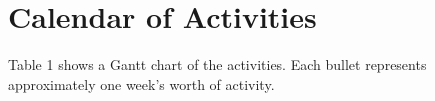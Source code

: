 


\section{Calendar of Activities}
Table 1 shows a Gantt chart of the activities. Each bullet represents approximately one week's worth of activity.
%
%

